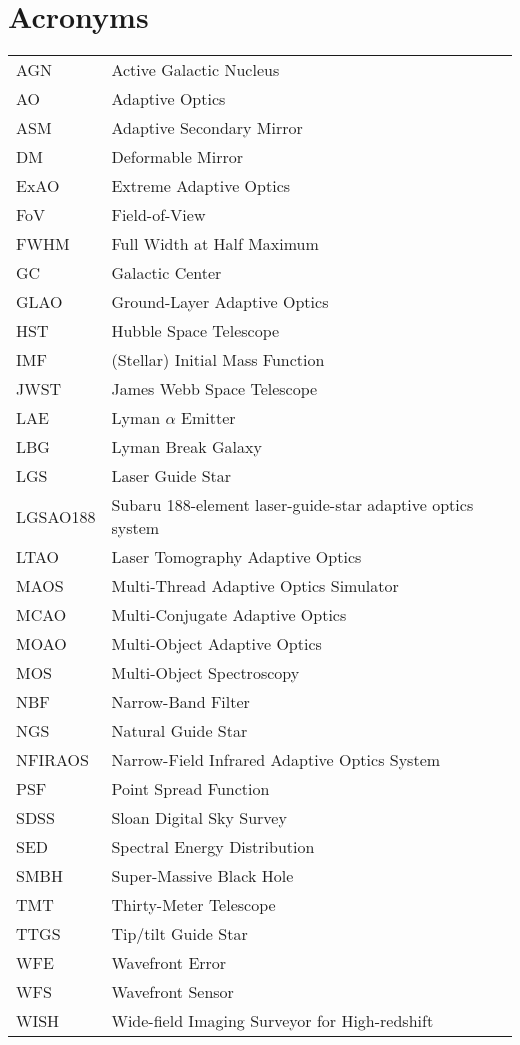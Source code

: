 \section*{Acronyms}
\begin{tabular}{ll}
AGN & Active Galactic Nucleus \\
AO & Adaptive Optics \\
ASM & Adaptive Secondary Mirror \\
DM & Deformable Mirror \\
ExAO & Extreme Adaptive Optics \\
FoV & Field-of-View \\
FWHM & Full Width at Half Maximum \\
GC & Galactic Center \\
GLAO & Ground-Layer Adaptive Optics \\
HST & Hubble Space Telescope \\
IMF & (Stellar) Initial Mass Function \\
JWST & James Webb Space Telescope \\
LAE & Lyman $\alpha$ Emitter \\
LBG & Lyman Break Galaxy \\
LGS & Laser Guide Star \\
LGSAO188 & Subaru 188-element laser-guide-star adaptive optics system \\
LTAO & Laser Tomography Adaptive Optics \\
MAOS & Multi-Thread Adaptive Optics Simulator \\
MCAO & Multi-Conjugate Adaptive Optics \\
MOAO & Multi-Object Adaptive Optics \\
MOS  & Multi-Object Spectroscopy \\
NBF & Narrow-Band Filter \\
NGS & Natural Guide Star \\
NFIRAOS & Narrow-Field Infrared Adaptive Optics System \\
PSF & Point Spread Function \\
SDSS & Sloan Digital Sky Survey \\
SED & Spectral Energy Distribution \\
SMBH & Super-Massive Black Hole \\
TMT & Thirty-Meter Telescope \\
TTGS & Tip/tilt Guide Star \\
WFE & Wavefront Error \\
WFS & Wavefront Sensor \\
WISH & Wide-field Imaging Surveyor for High-redshift \\
\end{tabular}
%
